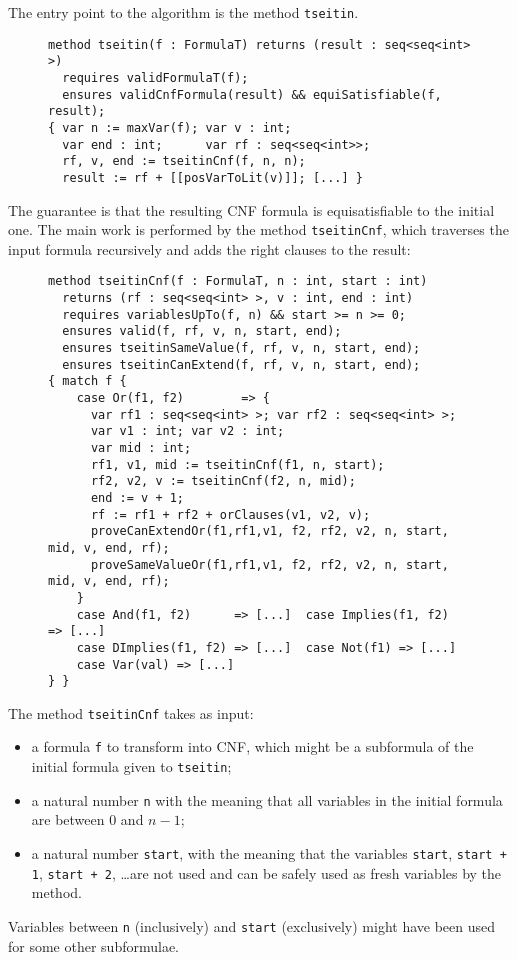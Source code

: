 The entry point to the algorithm is the method \texttt{tseitin}.

\begin{figure}[H]
\begin{Verbatim}[fontsize=\small, baselinestretch=0.1]
method tseitin(f : FormulaT) returns (result : seq<seq<int> >)
  requires validFormulaT(f);
  ensures validCnfFormula(result) && equiSatisfiable(f, result);
{ var n := maxVar(f); var v : int; 
  var end : int;      var rf : seq<seq<int>>;
  rf, v, end := tseitinCnf(f, n, n);
  result := rf + [[posVarToLit(v)]]; [...] }
\end{Verbatim}
\end{figure}

The guarantee is that the resulting CNF formula is equisatisfiable to the
initial one. The main work is performed by the method
\texttt{tseitinCnf}, which traverses the input formula recursively and
adds the right clauses to the result:

\begin{figure}[H]
\begin{Verbatim}[fontsize=\small, baselinestretch=0.1]
method tseitinCnf(f : FormulaT, n : int, start : int)
  returns (rf : seq<seq<int> >, v : int, end : int)
  requires variablesUpTo(f, n) && start >= n >= 0;
  ensures valid(f, rf, v, n, start, end);
  ensures tseitinSameValue(f, rf, v, n, start, end);
  ensures tseitinCanExtend(f, rf, v, n, start, end);
{ match f {
    case Or(f1, f2)        => {
      var rf1 : seq<seq<int> >; var rf2 : seq<seq<int> >;
      var v1 : int; var v2 : int;
      var mid : int;
      rf1, v1, mid := tseitinCnf(f1, n, start);
      rf2, v2, v := tseitinCnf(f2, n, mid);
      end := v + 1;
      rf := rf1 + rf2 + orClauses(v1, v2, v);
      proveCanExtendOr(f1,rf1,v1, f2, rf2, v2, n, start, mid, v, end, rf);
      proveSameValueOr(f1,rf1,v1, f2, rf2, v2, n, start, mid, v, end, rf);
    }
    case And(f1, f2)      => [...]  case Implies(f1, f2)  => [...]
    case DImplies(f1, f2) => [...]  case Not(f1) => [...]
    case Var(val) => [...]
} }
\end{Verbatim}
\end{figure}

The method \texttt{tseitinCnf} takes as input:
%
\begin{itemize}
%
\item a formula \texttt{f} to transform into CNF, which might be a
  subformula of the initial formula given to \texttt{tseitin};
%
\item a natural number \texttt{n} with the meaning that all variables
  in the initial formula are between \( 0 \) and \( n - 1 \);
%
\item a natural number \texttt{start}, with the meaning that the
  variables \texttt{start}, \texttt{start + 1}, \texttt{start + 2},
  \ldots are not used and can be safely used as fresh variables by the
  method.
%
\end{itemize}
%
Variables between \texttt{n} (inclusively) and \texttt{start}
(exclusively) might have been used for some other subformulae.

